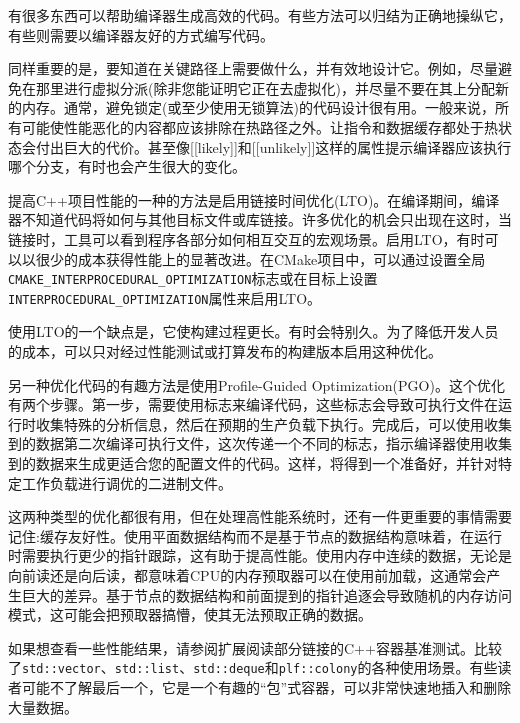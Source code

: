 
有很多东西可以帮助编译器生成高效的代码。有些方法可以归结为正确地操纵它，有些则需要以编译器友好的方式编写代码。

同样重要的是，要知道在关键路径上需要做什么，并有效地设计它。例如，尽量避免在那里进行虚拟分派(除非您能证明它正在去虚拟化)，并尽量不要在其上分配新的内存。通常，避免锁定(或至少使用无锁算法)的代码设计很有用。一般来说，所有可能使性能恶化的内容都应该排除在热路径之外。让指令和数据缓存都处于热状态会付出巨大的代价。甚至像[[likely]]和[[unlikely]]这样的属性提示编译器应该执行哪个分支，有时也会产生很大的变化。


提高C++项目性能的一种的方法是启用链接时间优化(LTO)。在编译期间，编译器不知道代码将如何与其他目标文件或库链接。许多优化的机会只出现在这时，当链接时，工具可以看到程序各部分如何相互交互的宏观场景。启用LTO，有时可以以很少的成本获得性能上的显著改进。在CMake项目中，可以通过设置全局\texttt{CMAKE\_INTERPROCEDURAL\_OPTIMIZATION}标志或在目标上设置\texttt{INTERPROCEDURAL\_OPTIMIZATION}属性来启用LTO。

使用LTO的一个缺点是，它使构建过程更长。有时会特别久。为了降低开发人员的成本，可以只对经过性能测试或打算发布的构建版本启用这种优化。


另一种优化代码的有趣方法是使用Profile-Guided Optimization(PGO)。这个优化有两个步骤。第一步，需要使用标志来编译代码，这些标志会导致可执行文件在运行时收集特殊的分析信息，然后在预期的生产负载下执行。完成后，可以使用收集到的数据第二次编译可执行文件，这次传递一个不同的标志，指示编译器使用收集到的数据来生成更适合您的配置文件的代码。这样，将得到一个准备好，并针对特定工作负载进行调优的二进制文件。


这两种类型的优化都很有用，但在处理高性能系统时，还有一件更重要的事情需要记住:缓存友好性。使用平面数据结构而不是基于节点的数据结构意味着，在运行时需要执行更少的指针跟踪，这有助于提高性能。使用内存中连续的数据，无论是向前读还是向后读，都意味着CPU的内存预取器可以在使用前加载，这通常会产生巨大的差异。基于节点的数据结构和前面提到的指针追逐会导致随机的内存访问模式，这可能会把预取器搞懵，使其无法预取正确的数据。

如果想查看一些性能结果，请参阅扩展阅读部分链接的C++容器基准测试。比较了\texttt{std::vector}、\texttt{std::list}、\texttt{std::deque}和\texttt{plf::colony}的各种使用场景。有些读者可能不了解最后一个，它是一个有趣的“包”式容器，可以非常快速地插入和删除大量数据。

